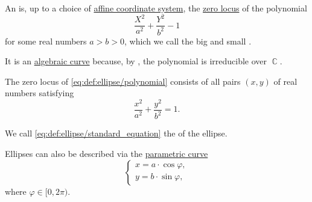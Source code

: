 \begin{definition}\label{def:ellipse}
  An  is, up to a choice of \hyperref[def:affine_coordinate_system]{affine coordinate system}, the \hyperref[def:zero_locus]{zero locus} of the polynomial
  \begin{equation}\label{eq:def:ellipse/polynomial}
    \frac {X^2} {a^2} + \frac {Y^2} {b^2} - 1
  \end{equation}
  for some real numbers \( a > b > 0 \), which we call the big and small .

  It is an \hyperref[def:affine_algebraic_set/curve]{algebraic curve} because, by , the polynomial is irreducible over \( \BbbC \).

  \begin{thmenum}
     The zero locus of \eqref{eq:def:ellipse/polynomial} consists of all pairs \( (x, y) \) of real numbers satisfying
    \begin{equation}\label{eq:def:ellipse/standard_equation}
      \frac {x^2} {a^2} + \frac {y^2} {b^2} = 1.
    \end{equation}

    We call \eqref{eq:def:ellipse/standard_equation} the  of the ellipse.

     Ellipses can also be described via the \hyperref[def:parametric_curve]{parametric curve}
    \begin{equation}\label{eq:def:ellipse/parametric_equation}
      \begin{cases}
        x = a \cdot \cos \varphi, \\
        y = b \cdot \sin \varphi,
      \end{cases}
    \end{equation}
    where \( \varphi \in [0, 2\pi) \).
  \end{thmenum}
\end{definition}
